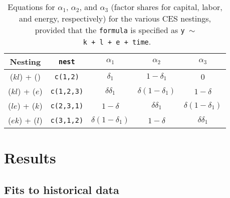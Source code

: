 \documentclass[preprint,authoryear,12pt]{elsarticle}\usepackage[]{graphicx}\usepackage[]{color}
\makeatletter
\newenvironment{kframe}{%
 \def\at@end@of@kframe{}%
 \ifinner\ifhmode%
  \def\at@end@of@kframe{\end{minipage}}%
  \begin{minipage}{\columnwidth}%
 \fi\fi%
 \def\FrameCommand##1{\hskip\@totalleftmargin \hskip-\fboxsep
 \colorbox{shadecolor}{##1}\hskip-\fboxsep
     \hskip-\linewidth \hskip-\@totalleftmargin \hskip\columnwidth}%
 \MakeFramed {\advance\hsize-\width
   \@totalleftmargin\z@ \linewidth\hsize
   \@setminipage}}%
 {\par\unskip\endMakeFramed%
 \at@end@of@kframe}
\newenvironment{knitrout}{}{} %
\makeatother
\begin{document}
\begin{table} \caption{Equations for $\alpha_1$, $\alpha_2$, and $\alpha_3$ 
                        (factor shares for capital, labor, and energy, respectively)
                        for the various CES nestings, 
                        provided that the \texttt{formula} is specified as \texttt{y~$\sim$~k~+~l~+~e~+~time}.} 
\label{tab:CES_abg_equations} 
  \begin{center}
    \begin{tabular}{c c c c c} 
      \toprule
      Nesting         & \texttt{nest}     & $\alpha_1$              & $\alpha_2$              & $\alpha_3$       \\
      \midrule
      ($kl$) + ()     & \texttt{c(1,2)}   & $\delta_1$              & $1 - \delta_1$          & 0          \\
      ($kl$) + ($e$)  & \texttt{c(1,2,3)} & $\delta \delta_1$       & $\delta (1 - \delta_1)$ & $1 - \delta$ \\   
      ($le$) + ($k$)  & \texttt{c(2,3,1)} & $1 - \delta$            & $\delta \delta_1$       & $\delta (1 - \delta_1)$ \\
      ($ek$) + ($l$)  & \texttt{c(3,1,2)} & $\delta (1 - \delta_1)$ & $1 - \delta$            & $\delta \delta_1$ \\
      \bottomrule
    \end{tabular}
  \end{center}
\end{table}

\begin{knitrout}
\color{fgcolor}\begin{kframe}


{\ttfamily\noindent\bfseries\color{errorcolor}{Error in saveRDS(models, file = fileName): object 'fileName' not found}}\end{kframe}
\end{knitrout}




\section{Results}
\label{sec:results}

\subsection{Fits to historical data} 
\label{sec:fits_to_historical_data}
\end{document}
